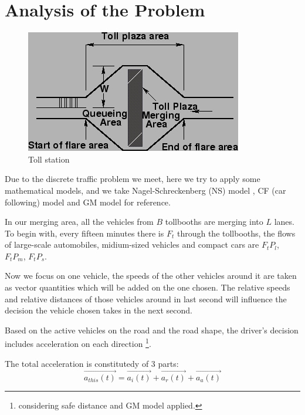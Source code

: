 \documentclass{mcmthesis}
\begin{document}
\section{Analysis of the Problem}
\begin{figure}[htbp]
\small
\centering
\caption{Toll station \cite{note}} \label{fig:Ts}
\includegraphics{img3.png}
\end{figure}

Due to the discrete traffic problem we meet, here we try to apply some mathematical models, and we take Nagel-Schreckenberg (NS) model \cite{acelluar}, CF (car following) model and GM model for reference.

In our merging area, all the vehicles from $B$ tollbooths are merging into $L$ lanes. To begin with, every fifteen minutes there is $F_t$ through the tollbooths, the flows of large-scale automobiles, midium-sized vehicles and compact cars are $F_tP_l$, $F_tP_m$, $F_tP_s$.

Now we focus on one vehicle, the speeds of the other vehicles around it are taken as vector quantities which will be added on the one chosen.  The relative speeds and relative distances of those vehicles around in last second will influence the decision the vehicle chosen takes in the next second. 

Based on the active vehicles on the road and the road shape, the driver's decision includes acceleration on each direction \footnote{considering safe distance and GM model applied.}.


The total acceleration is constitutedy of 3 parts: 
$$\overrightarrow{a_{this}(t)}=\overrightarrow{a_i(t)}+\overrightarrow{a_r(t)}+\overrightarrow{a_a(t)}$$
\end{document}
